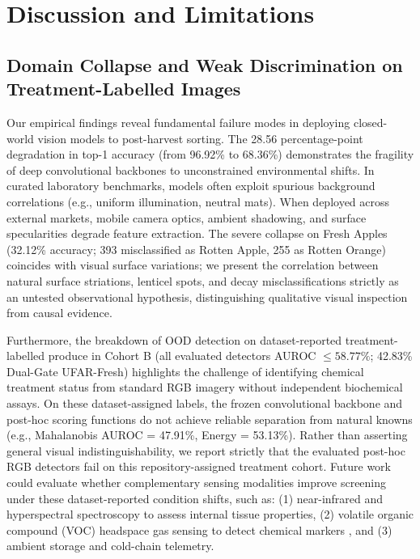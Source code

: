 \section{Discussion and Limitations}
\label{sec:discussion_limitations}

\subsection{Domain Collapse and Weak Discrimination on Treatment-Labelled Images}
Our empirical findings reveal fundamental failure modes in deploying closed-world vision models to post-harvest sorting. The 28.56 percentage-point degradation in top-1 accuracy (from 96.92\% to 68.36\%) demonstrates the fragility of deep convolutional backbones to unconstrained environmental shifts. In curated laboratory benchmarks, models often exploit spurious background correlations (e.g., uniform illumination, neutral mats). When deployed across external markets, mobile camera optics, ambient shadowing, and surface specularities degrade feature extraction. The severe collapse on Fresh Apples (32.12\% accuracy; 393 misclassified as Rotten Apple, 255 as Rotten Orange) coincides with visual surface variations; we present the correlation between natural surface striations, lenticel spots, and decay misclassifications strictly as an untested observational hypothesis, distinguishing qualitative visual inspection from causal evidence.

Furthermore, the breakdown of OOD detection on dataset-reported treatment-labelled produce in Cohort B (all evaluated detectors AUROC $\le 58.77\%$; 42.83\% Dual-Gate UFAR-Fresh) highlights the challenge of identifying chemical treatment status from standard RGB imagery without independent biochemical assays. On these dataset-assigned labels, the frozen convolutional backbone and post-hoc scoring functions do not achieve reliable separation from natural knowns (e.g., Mahalanobis AUROC = 47.91\%, Energy = 53.13\%). Rather than asserting general visual indistinguishability, we report strictly that the evaluated post-hoc RGB detectors fail on this repository-assigned treatment cohort. Future work could evaluate whether complementary sensing modalities improve screening under these dataset-reported condition shifts, such as: (1) near-infrared and hyperspectral spectroscopy to assess internal tissue properties, (2) volatile organic compound (VOC) headspace gas sensing to detect chemical markers \cite{sattar2024sensornet}, and (3) ambient storage and cold-chain telemetry.

